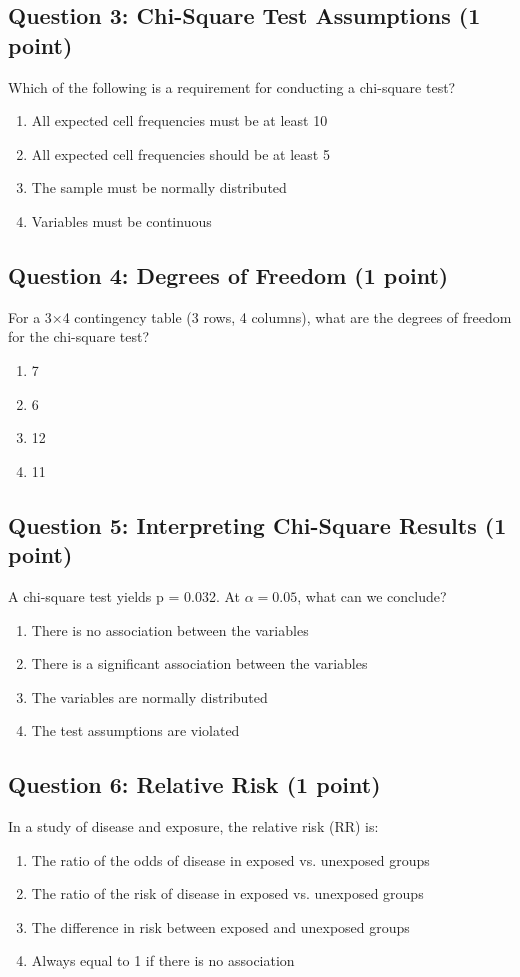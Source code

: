 \documentclass[10pt]{article}
\begin{document}
\subsection*{Question 3: Chi-Square Test Assumptions (1 point)}
Which of the following is a requirement for conducting a chi-square test?
\begin{enumerate}[label=\Alph*., leftmargin=20pt]
\item All expected cell frequencies must be at least 10
\item All expected cell frequencies should be at least 5
\item The sample must be normally distributed
\item Variables must be continuous
\end{enumerate}

\subsection*{Question 4: Degrees of Freedom (1 point)}
For a 3×4 contingency table (3 rows, 4 columns), what are the degrees of freedom for the chi-square test?
\begin{enumerate}[label=\Alph*., leftmargin=20pt]
\item 7
\item 6
\item 12
\item 11
\end{enumerate}

\subsection*{Question 5: Interpreting Chi-Square Results (1 point)}
A chi-square test yields p = 0.032. At $\alpha = 0.05$, what can we conclude?
\begin{enumerate}[label=\Alph*., leftmargin=20pt]
\item There is no association between the variables
\item There is a significant association between the variables
\item The variables are normally distributed
\item The test assumptions are violated
\end{enumerate}

\subsection*{Question 6: Relative Risk (1 point)}
In a study of disease and exposure, the relative risk (RR) is:
\begin{enumerate}[label=\Alph*., leftmargin=20pt]
\item The ratio of the odds of disease in exposed vs. unexposed groups
\item The ratio of the risk of disease in exposed vs. unexposed groups
\item The difference in risk between exposed and unexposed groups
\item Always equal to 1 if there is no association
\end{enumerate}
\end{document}

